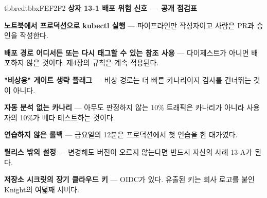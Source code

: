 \begin{calloutbox}{tbbred}{tbbxFEF2F2}
{\normalsize\bfseries\color{tbbx991B1B}상자 13-1  배포 위험 신호 — 공개 점검표}\par\vspace{3pt}
\begin{tbbitemize}
  \item \textbf{노트북에서 프로덕션으로 kubectl 실행} — 파이프라인만 작성자이고 사람은 PR과 승인을 작성한다.
  \item \textbf{배포 경로 어디서든  또는 다시 태그할 수 있는 참조 사용} — 다이제스트가 아니면 배포하지 않은 것이다. 제4장의 규칙은 계속 적용된다.
  \item \textbf{"비상용" 게이트 생략 플래그} — 비상 경로는 더 빠른 카나리이지 검사를 건너뛰는 것이 아니다.
  \item \textbf{자동 분석 없는 카나리} — 아무도 판정하지 않는 10\% 트래픽은 카나리가 아니라 사용자의 10\%가 베타 테스트하는 것이다.
  \item \textbf{연습하지 않은 롤백} — 금요일의 12분은 프로덕션에서 첫 연습을 한 대가였다.
  \item \textbf{릴리스 밖의 설정} — 변경해도 버전이 오르지 않는다면 반드시 자신의 사례 13-A가 된다.
  \item \textbf{저장소 시크릿의 장기 클라우드 키} — OIDC가 있다. 유출된 키는 회사 로고를 붙인 Knight의 여덟째 서버다.
\end{tbbitemize}
\end{calloutbox}

\vspace{3.0pt}

